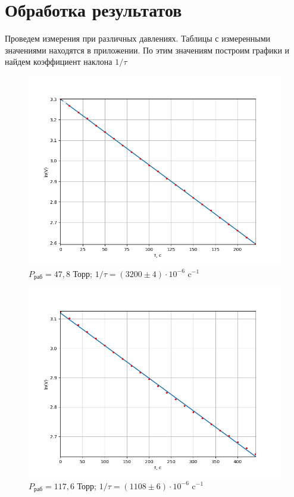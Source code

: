 \documentclass[12pt]{article}
\begin{document}
\section{Обработка результатов}

Проведем измерения при различных давлениях. Таблицы с измеренными значениями находятся в приложении.
По этим значениям построим графики и найдем коэффициент наклона $1/\tau$

\begin{figure}[H]
	\centering
	\includegraphics[scale = 0.695]{./images/Gr1.png}
	\caption{$P_\text{раб} = 47,8$ Торр;  $1/\tau = (3200 \pm 4) \cdot 10^{-6}$ c$^{-1}$}
	\label{fig:Gr1}
\end{figure}

\begin{figure}[H]
	\centering
	\includegraphics[scale = 0.695]{./images/Gr2.png}
	\caption{$P_\text{раб} = 117,6$ Торр;  $1/\tau = (1108 \pm 6) \cdot 10^{-6}$ c$^{-1}$}
	\label{fig:Gr2}
\end{figure}
\end{document}
